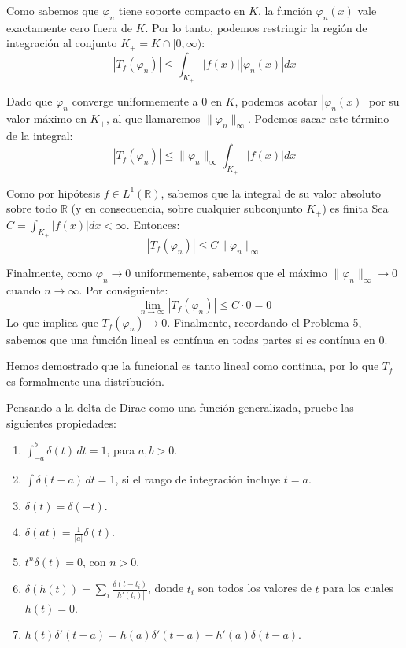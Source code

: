 \documentclass[11pt,spanish]{article}
\newcounter{problema}
\newcommand{\prob}{\stepcounter{problema} \vspace{.5cm} \noindent{\bf Problema \arabic{problema}: }}
\begin{document}
\begin{itemize}
Como sabemos que $\varphi_n$ tiene soporte compacto en $K$, la función $\varphi_n(x)$ vale exactamente cero fuera de $K$. Por lo tanto, podemos restringir la región de integración al conjunto $K_+ = K \cap [0, \infty)$:
$$|T_f(\varphi_n)| \le \int_{K_+} |f(x)| |\varphi_n(x)| dx$$

Dado que $\varphi_n$ converge uniformemente a 0 en $K$, podemos acotar $|\varphi_n(x)|$ por su valor máximo en $K_+$, al que llamaremos $\|\varphi_n\|_{\infty}$. Podemos sacar este término de la integral:
$$|T_f(\varphi_n)| \le \|\varphi_n\|_{\infty} \int_{K_+} |f(x)| dx$$

Como por hipótesis $f \in L^1(\mathbb{R})$, sabemos que la integral de su valor absoluto sobre todo $\mathbb{R}$ (y en consecuencia, sobre cualquier subconjunto $K_+$) es finita Sea $C = \int_{K_+} |f(x)| dx < \infty$. Entonces:
$$|T_f(\varphi_n)| \le C \|\varphi_n\|_{\infty}$$

Finalmente, como $\varphi_n \to 0$ uniformemente, sabemos que el máximo $\|\varphi_n\|_{\infty} \to 0$ cuando $n \to \infty$. Por consiguiente:
$$\lim_{n \to \infty} |T_f(\varphi_n)| \le C \cdot 0 = 0$$
Lo que implica que $T_f(\varphi_n) \to 0$.
Finalmente, recordando el Problema 5, sabemos que una funci\'on lineal es cont\'inua en todas partes si es cont\'inua en 0.
\end{itemize}

Hemos demostrado que la funcional es tanto lineal como continua, por lo que $T_f$ es formalmente una distribución.








\prob Pensando a la delta de Dirac como una función generalizada, pruebe las siguientes propiedades:
\begin{enumerate}
\item $\displaystyle \int_{-a}^{b} \delta(t)\,dt = 1$, para $a,b>0$.
\item $\displaystyle \int \delta(t-a)\,dt = 1$, si el rango de integración incluye $t=a$.
\item $\delta(t) = \delta(-t)$.
\item $\displaystyle \delta(at) = \frac{1}{|a|}\delta(t)$.
\item $t^n\delta(t)=0$, con $n>0$.
\item $\displaystyle \delta(h(t)) = \sum_i \frac{\delta(t-t_i)}{|h'(t_i)|}$, donde $t_i$ son todos los valores de $t$ para los cuales $h(t)=0$.
\item $\displaystyle h(t)\delta'(t-a) = h(a)\delta'(t-a) - h'(a)\delta(t-a)$.
\end{enumerate}
\end{document}
